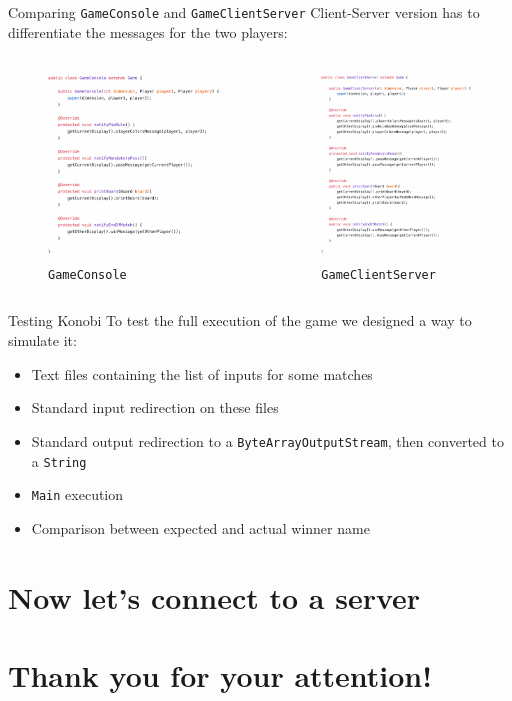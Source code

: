 \documentclass{beamer}
\begin{document}
\begin{frame}{Comparing \texttt{GameConsole} and \texttt{GameClientServer}}
Client-Server version has to differentiate the messages for the two players:
\begin{columns}
			\begin{figure}
				\includegraphics[height=5cm, keepaspectratio]{images/gameconsole.png}
				\caption*{\texttt{GameConsole}}
			\end{figure}
					
			\begin{figure}
				\includegraphics[height=5cm, keepaspectratio]{images/gamecs.png}
				\caption*{\texttt{GameClientServer}}
			\end{figure}
		
	\end{columns}
\end{frame}

\begin{frame}{Testing Konobi}
To test the full execution of the game we designed a way to simulate it:
\begin{itemize}

\item Text files containing the list of inputs for some matches
\item Standard input redirection on these files
\item Standard output redirection to a \texttt{ByteArrayOutputStream}, then converted to a \texttt{String}
\item \texttt{Main} execution
\item Comparison between expected and actual winner name
\end{itemize}
\end{frame}

\section{Now let's connect to a server}

\section{Thank you for your attention!}


     
\end{document}
